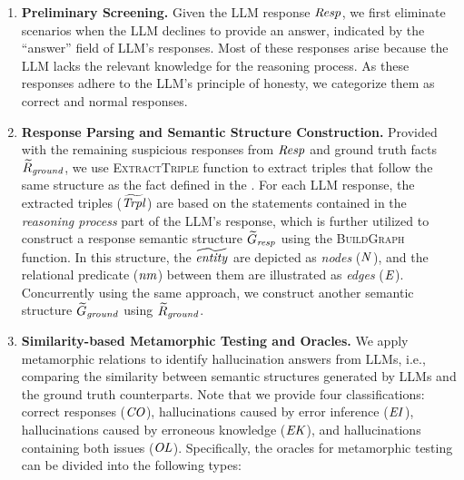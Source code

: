 \begin{enumerate}[wide,  labelindent=9pt]
\item \textbf{Preliminary Screening.} Given the LLM response $\mathit{Resp}$, we first eliminate scenarios when the LLM declines to provide an answer, indicated by the ``answer'' field of LLM's responses. 
Most of these responses arise because the LLM lacks the relevant knowledge for the reasoning process. As these responses adhere to the LLM's principle of honesty, we categorize them as correct and normal responses.

\item \textbf{Response Parsing and Semantic Structure Construction.} Provided with the remaining suspicious responses from $\mathit{Resp}$ and ground truth facts $\widetilde{R}_{\mathit{ground}}$, we use \textsc{ExtractTriple} function to extract triples that follow the same structure as the fact defined in the . For each LLM response, the extracted triples ($\widetilde{\mathit{Trpl}}$) are based on the statements contained in the \textit{reasoning process} part of the LLM's response, which is further utilized to construct a response semantic structure $\widetilde{G}_{\mathit{resp}}$ using the \textsc{BuildGraph} function. In this structure, the $\widetilde{\mathit{entity}}$ are depicted as \emph{nodes} ($\mathit{N}$), and the relational predicate ($\mathit{nm}$) between them are illustrated as \emph{edges} ($\mathit{E}$). Concurrently using the same approach, we construct another semantic structure $\widetilde{G}_{\mathit{ground}}$ using $\widetilde{R}_{\mathit{ground}}$.

\item \textbf{Similarity-based Metamorphic Testing and Oracles.} 
We apply metamorphic relations to identify hallucination answers from LLMs, i.e., comparing the similarity between semantic structures generated by LLMs and the ground truth counterparts. Note that we provide four classifications: correct responses ($\mathit{CO}$), hallucinations caused by error inference ($\mathit{EI}$), hallucinations caused by erroneous knowledge ($\mathit{EK}$), and hallucinations containing both issues ($\mathit{OL}$). 
Specifically, the oracles for metamorphic testing can be divided into the following types:
 
\end{enumerate}

